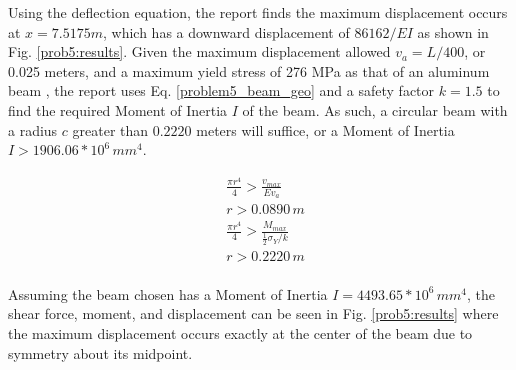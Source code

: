 \documentclass[a4paper]{article}
\begin{document}
Using the deflection equation, the report finds the maximum displacement occurs at $x = 7.5175 m$, which has a downward displacement of $86162/EI$ as shown in Fig. \ref{prob5:results}. Given the maximum displacement allowed $v_a = L/400$, or 0.025 meters, and a maximum yield stress of 276 MPa as that of an aluminum beam , the report uses Eq. \ref{problem5_beam_geo} and a safety factor $k=1.5$ to find the required Moment of Inertia $I$ of the beam. As such, a circular beam with a radius $c$ greater than $0.2220$ meters will suffice, or a Moment of Inertia $I > 1906.06 * 10^6\,{mm}^4$.

\begin{equation}
\begin{split}
& \frac{\pi r^4}{4} > \frac{v_{max}}{Ev_a} \\
& r > 0.0890\,m \\
& \frac{\pi r^4}{4} > \frac{M_{max}}{\frac{1}{2}\sigma_Y/ k}\\
& r > 0.2220\,m \\
\end{split}
\label{problem5_beam_geo}
\end{equation}

Assuming the beam chosen has a Moment of Inertia $I = 4493.65 * 10^6\,{mm}^4$, the shear force, moment, and displacement can be seen in Fig. \ref{prob5:results} where the maximum displacement occurs exactly at the center of the beam due to symmetry about its midpoint.
\end{document}
